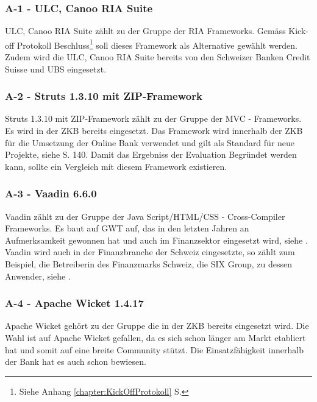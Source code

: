   \subsubsection{A-1 - ULC, Canoo RIA Suite}
  
  ULC, Canoo RIA Suite zählt zu der Gruppe der \ac{RIA} Frameworks. Gemäss
  Kick-off Protokoll Beschluss\footnote{Siehe Anhang
  \ref{chapter:KickOffProtokoll}  S.
  \pageref{chapter:KickOffProtokoll}} soll dieses Framework als Alternative
  gewählt werden. Zudem wird die ULC, Canoo RIA Suite bereits von den Schweizer
  Banken Credit Suisse und UBS eingesetzt.
  
  \subsubsection{A-2 - Struts 1.3.10 mit ZIP-Framework}
  
  Struts 1.3.10 mit ZIP-Framework zählt zu der Gruppe der MVC - Frameworks. Es
  wird in der \ac{ZKB} bereits eingesetzt. Das Framework wird innerhalb der
  \ac{ZKB} für die Umsetzung der Online Bank verwendet und gilt als Standard
  für neue Projekte, siehe \cite{ZkbHandbuchDerItArchitektur}  S. 140. Damit
  das Ergebniss der Evaluation Begründet werden kann, sollte ein Vergleich mit
  diesem Framework existieren.
  
  \subsubsection{A-3 - Vaadin 6.6.0}
  
  Vaadin zählt zu der Gruppe der Java Script/\ac{HTML}/\ac{CSS} -
  Cross-Compiler Frameworks. Es baut auf \ac{GWT} auf, das in den letzten
  Jahren an Aufmerksamkeit gewonnen hat und auch im Finanzsektor eingesetzt
  wird, siehe \cite{GWTImFinanzSektor}. Vaadin wird auch in der Finanzbranche
  der Schweiz eingesetzte, so zählt zum Beispiel, die Betreiberin des
  Finanzmarks Schweiz, die SIX Group, zu dessen Anwender, siehe
  \cite{VaadinInDerSchweiz}.
  
  \subsubsection{A-4 - Apache Wicket 1.4.17}
  
  Apache Wicket gehört zu der Gruppe die in der ZKB bereits eingesetzt wird.
  Die Wahl ist auf Apache Wicket gefallen, da es sich schon länger am Markt
  etabliert hat und somit auf eine breite Community stützt. Die
  Einsatzfähigkeit innerhalb der Bank  hat es auch schon bewiesen.
  
